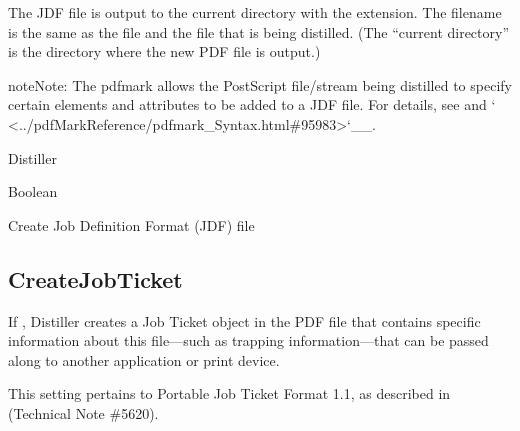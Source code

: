 \documentclass[letterpaper,12pt,english,openany,oneside]{sphinxmanual}
\begin{document}
The JDF file is output to the current directory with the  extension. The filename is the same as the  file and the file that is being distilled. (The “current directory” is the directory where the new PDF file is output.)

\begin{sphinxadmonition}{note}{Note:}
The  pdfmark allows the PostScript file/stream being distilled to specify certain elements and attributes to be added to a JDF file. For details, see  and ` <../pdfMarkReference/pdfmark\_Syntax.html\#95983>`\_\_.
\end{sphinxadmonition}
\label{\detokenize{PDF_Create_CommonSettings:supported-by-90}}

Distiller

\label{\detokenize{PDF_Create_CommonSettings:type-89}}

Boolean

\label{\detokenize{PDF_Create_CommonSettings:ui-name-73}}

Create Job Definition Format (JDF) file

\label{\detokenize{PDF_Create_CommonSettings:default-value-84}}

\begin{sphinxVerbatim}[commandchars=\\\{\}]
\end{sphinxVerbatim}




\subsection{CreateJobTicket}
\label{\detokenize{PDF_Create_CommonSettings:createjobticket}}
If  , Distiller creates a Job Ticket object in the PDF file that contains specific information about this file—such as trapping information—that can be passed along to another application or print device.

This setting pertains to Portable Job Ticket Format 1.1, as described in  (Technical Note \#5620).

\label{\detokenize{PDF_Create_CommonSettings:supported-by-91}}
\end{document}

